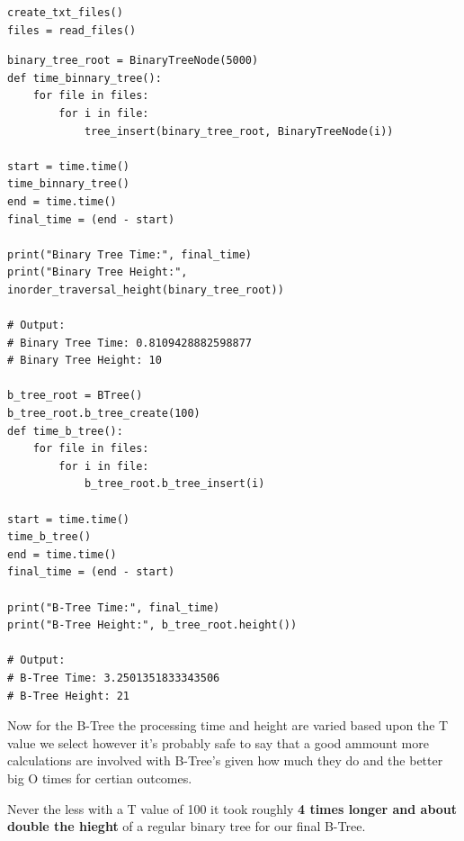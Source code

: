 \documentclass{article}
\begin{document}
\begin{enumerate}
\begin{enumerate}
\begin{lstlisting}
create_txt_files()
files = read_files()
    \end{lstlisting}

    \begin{lstlisting}
binary_tree_root = BinaryTreeNode(5000)
def time_binnary_tree():
    for file in files:
        for i in file:
            tree_insert(binary_tree_root, BinaryTreeNode(i)) 

start = time.time()
time_binnary_tree()
end = time.time()                   
final_time = (end - start)
    
print("Binary Tree Time:", final_time)  
print("Binary Tree Height:", inorder_traversal_height(binary_tree_root))

# Output:
# Binary Tree Time: 0.8109428882598877
# Binary Tree Height: 10

b_tree_root = BTree()
b_tree_root.b_tree_create(100)
def time_b_tree():
    for file in files:
        for i in file:
            b_tree_root.b_tree_insert(i)

start = time.time()
time_b_tree()
end = time.time()                   
final_time = (end - start)
    
print("B-Tree Time:", final_time)  
print("B-Tree Height:", b_tree_root.height())

# Output:
# B-Tree Time: 3.2501351833343506
# B-Tree Height: 21
    \end{lstlisting}

    Now for the B-Tree the processing time and height are varied based upon the T value we select however it's probably safe to say that a good ammount more calculations are involved with B-Tree's given how much they do and the better big O times for certian outcomes.

    Never the less with a T value of 100 it took roughly \textbf{4 times longer and about double the hieght} of a regular binary tree for our final B-Tree.

  \end{enumerate}

  \end{enumerate}  %
\end{document}
